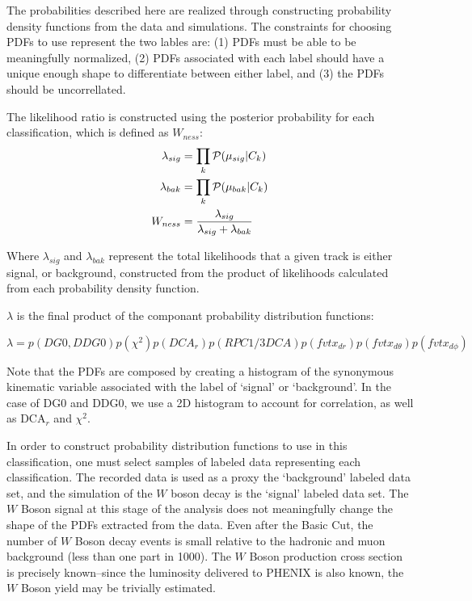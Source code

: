 The probabilities described here are realized through constructing probability
density functions from the data and simulations. The constraints for choosing
PDFs to use represent the two lables are: (1) PDFs must be able to be
meaningfully normalized, (2) PDFs associated with each label should have a
unique enough shape to differentiate between either label, and (3) the PDFs
should be uncorrellated.
 

The likelihood ratio is constructed using the posterior probability
for each classification, which is defined as $W_{ness}$:
\begin{align}
  \lambda_{sig} &= \prod_{k}\mathcal{P}(\mu_{sig}\vert C_k)\\
  \lambda_{bak} &= \prod_{k}\mathcal{P}(\mu_{bak}\vert C_k)\\
  W_{ness} &= { 
    {\lambda_{sig}}
    \over 
    {\lambda_{sig}+\lambda_{bak}}\label{eq:wness_calculation}
  }
\end{align}

{\noindent}Where $\lambda_{sig}$ and $\lambda_{bak}$ represent the total
likelihoods that a given track is either signal, or background, constructed from
the product of likelihoods calculated from each probability density function.

{\noindent}$\lambda$ is the final product of the componant probability
distribution functions:

\begin{equation}
	\lambda =
	p(DG0,DDG0)p(\chi^2)p(DCA_r)p(RPC1/3DCA)p(fvtx_{dr})p(fvtx_{d\theta})p(fvtx_{d\phi})
	\label{eq:full_lambda}
\end{equation}

Note that the PDFs are composed by creating a histogram of the synonymous
kinematic variable associated with the label of `signal' or `background'. In the
case of DG0 and DDG0, we use a 2D histogram to account for correlation, as well
as DCA$_r$ and $\chi^2$.

In order to construct probability distribution functions to use in this
classification, one must select samples of labeled data representing each
classification. The recorded data is used as a proxy the `background' labeled
data set, and the simulation of the $W$ boson decay is the `signal' labeled data
set. The $W$ Boson signal at this stage of the analysis does not meaningfully
change the shape of the PDFs extracted from the data. Even after the Basic Cut,
the number of $W$ Boson decay events is small relative to the hadronic and muon
background (less than one part in 1000). The $W$ Boson production cross section
is precisely known--since the luminosity delivered to PHENIX is also known, the
$W$ Boson yield may be trivially estimated.

